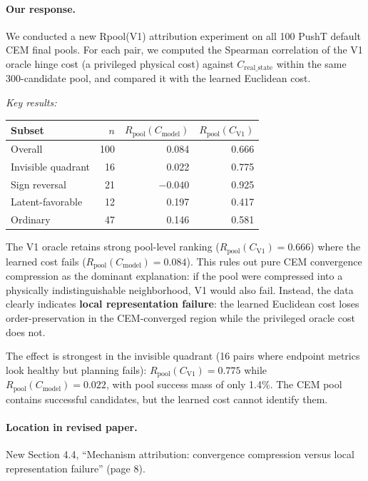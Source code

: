 \documentclass[11pt]{article}
\newcommand{\Rpool}{R_{\mathrm{pool}}}
\newcommand{\Cmodel}{C_{\mathrm{model}}}
\newcommand{\CVone}{C_{\mathrm{V1}}}
\newcommand{\Creal}{C_{\mathrm{real\_state}}}
\begin{document}
\paragraph{Our response.}
We conducted a new Rpool(V1) attribution experiment on all 100 PushT default CEM final pools. For each pair, we computed the Spearman correlation of the V1 oracle hinge cost (a privileged physical cost) against $\Creal$ within the same 300-candidate pool, and compared it with the learned Euclidean cost.

\textit{Key results:}

\begin{center}
\begin{tabular}{lrrr}
\toprule
Subset & $n$ & $\Rpool(\Cmodel)$ & $\Rpool(\CVone)$ \\
\midrule
Overall & 100 & 0.084 & 0.666 \\
Invisible quadrant & 16 & 0.022 & 0.775 \\
Sign reversal & 21 & $-0.040$ & 0.925 \\
Latent-favorable & 12 & 0.197 & 0.417 \\
Ordinary & 47 & 0.146 & 0.581 \\
\bottomrule
\end{tabular}
\end{center}

The V1 oracle retains strong pool-level ranking ($\Rpool(\CVone) = 0.666$) where the learned cost fails ($\Rpool(\Cmodel) = 0.084$). This rules out pure CEM convergence compression as the dominant explanation: if the pool were compressed into a physically indistinguishable neighborhood, V1 would also fail. Instead, the data clearly indicates \textbf{local representation failure}: the learned Euclidean cost loses order-preservation in the CEM-converged region while the privileged oracle cost does not.

The effect is strongest in the invisible quadrant (16 pairs where endpoint metrics look healthy but planning fails): $\Rpool(\CVone) = 0.775$ while $\Rpool(\Cmodel) = 0.022$, with pool success mass of only 1.4\%. The CEM pool contains successful candidates, but the learned cost cannot identify them.

\paragraph{Location in revised paper.}
New Section 4.4, ``Mechanism attribution: convergence compression versus local representation failure'' (page 8).
\end{document}

